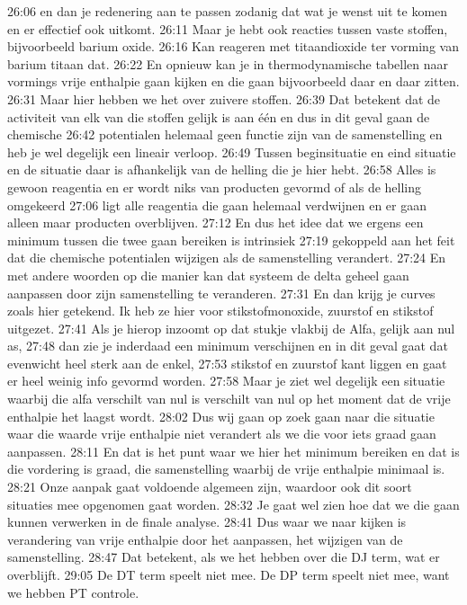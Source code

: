 26:06
en dan je redenering aan te passen zodanig dat wat je wenst uit te komen en er effectief ook uitkomt.
26:11
Maar je hebt ook reacties tussen vaste stoffen, bijvoorbeeld barium oxide.
26:16
Kan reageren met titaandioxide ter vorming van barium titaan dat.
26:22
En opnieuw kan je in thermodynamische tabellen naar vormings vrije enthalpie gaan kijken en die gaan bijvoorbeeld daar en daar zitten.
26:31
Maar hier hebben we het over zuivere stoffen.
26:39
Dat betekent dat de activiteit van elk van die stoffen gelijk is aan één en dus in dit geval gaan de chemische
26:42
potentialen helemaal geen functie zijn van de samenstelling en heb je wel degelijk een lineair verloop.
26:49
Tussen beginsituatie en eind situatie en de situatie daar is afhankelijk van de helling die je hier hebt.
26:58
Alles is gewoon reagentia en er wordt niks van producten gevormd of als de helling omgekeerd
27:06
ligt alle reagentia die gaan helemaal verdwijnen en er gaan alleen maar producten overblijven.
27:12
En dus het idee dat we ergens een minimum tussen die twee gaan bereiken is intrinsiek
27:19
gekoppeld aan het feit dat die chemische potentialen wijzigen als de samenstelling verandert.
27:24
En met andere woorden op die manier kan dat systeem de delta geheel gaan aanpassen door zijn samenstelling te veranderen.
27:31
En dan krijg je curves zoals hier getekend. Ik heb ze hier voor stikstofmonoxide, zuurstof en stikstof uitgezet.
27:41
Als je hierop inzoomt op dat stukje vlakbij de Alfa, gelijk aan nul as,
27:48
dan zie je inderdaad een minimum verschijnen en in dit geval gaat dat evenwicht heel sterk aan de enkel,
27:53
stikstof en zuurstof kant liggen en gaat er heel weinig info gevormd worden.
27:58
Maar je ziet wel degelijk een situatie waarbij die alfa verschilt van nul is verschilt van nul op het moment dat de vrije enthalpie het laagst wordt.
28:02
Dus wij gaan op zoek gaan naar die situatie waar die waarde vrije enthalpie niet verandert als we die voor iets graad gaan aanpassen.
28:11
En dat is het punt waar we hier het minimum bereiken en dat is die vordering is graad, die samenstelling waarbij de vrije enthalpie minimaal is.
28:21
Onze aanpak gaat voldoende algemeen zijn, waardoor ook dit soort situaties mee opgenomen gaat worden.
28:32
Je gaat wel zien hoe dat we die gaan kunnen verwerken in de finale analyse.
28:41
Dus waar we naar kijken is verandering van vrije enthalpie door het aanpassen, het wijzigen van de samenstelling.
28:47
Dat betekent, als we het hebben over die DJ term, wat er overblijft.
29:05
De DT term speelt niet mee. De DP term speelt niet mee, want we hebben PT controle.
